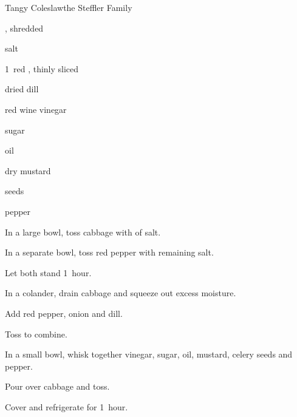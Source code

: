 \begin{recipe}{Tangy Coleslaw}{the Steffler Family}{}

\begin{ingredients}
\item {} , shredded
\item \tp{1\quarter} salt
\item 1~red , thinly sliced
\item {} dried dill
\item \C{\quarter} red wine vinegar
\item {} sugar
\item {} oil
\item {} dry mustard
\item \tp{\threequarter}  seeds
\item \tp{\quarter} pepper
\end{ingredients}

\begin{directions}
\item In a large bowl, toss cabbage with  of salt.
\item In a separate bowl, toss red pepper with remaining salt.
\item Let both stand 1~hour.
\item In a colander, drain cabbage and squeeze out excess moisture.
\item Add red pepper, onion and dill.
\item Toss to combine.
\item In a small bowl, whisk together vinegar, sugar, oil, mustard, celery seeds and pepper.
\item Pour over cabbage and toss.
\item Cover and refrigerate for 1~hour.
\end{directions}

\end{recipe}
